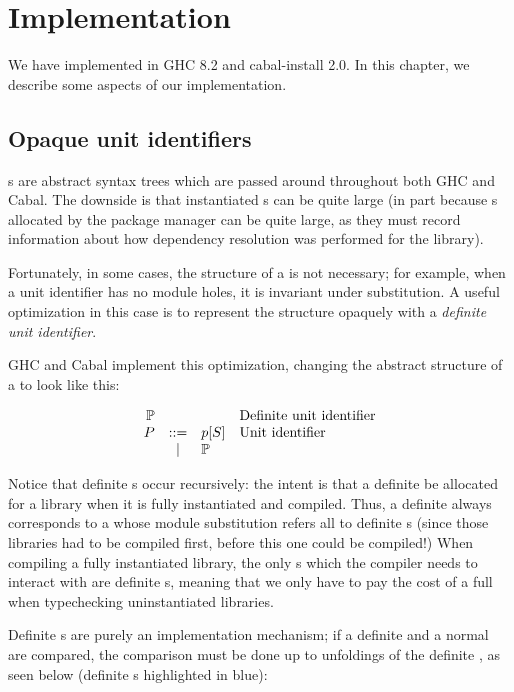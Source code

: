 \chapter{Implementation}
\label{sec:implementation}

We have implemented \Backpack{} in GHC 8.2 and cabal-install 2.0.  In
this chapter, we describe some aspects of our implementation.

\section{Opaque unit identifiers}
\label{sec:opaque-uid}

\Uid{}s are abstract syntax trees which are passed around throughout
both GHC and Cabal.  The downside is that instantiated \uid{}s
can be quite large (in part because \cid{}s allocated by the
package manager can be quite large, as they must record information
about how dependency resolution was performed for the library).

Fortunately, in some cases, the structure of a \uid{} is not necessary;
for example, when a unit identifier has no module holes, it is
invariant under substitution.  A useful optimization in this case
is to represent the structure opaquely with a \emph{definite unit
identifier}.

GHC and Cabal implement this optimization, changing the
abstract structure of a \uid{} to look like this:

\[
\begin{array}{rcll}
  \mathbb{P} &&& \text{Definite \uid{}} \\
  \UP &::=& \icid{\Up}{S} & \text{\Uid} \\
      & | & \mathbb{P} \\
\end{array}
\]

\noindent
Notice that definite \uid{}s occur recursively: the intent is that a
definite \uid{} be allocated for a library when it is fully instantiated
and compiled.  Thus, a definite \uid{} always corresponds to a \uid{}
whose module substitution refers all to definite \uid{}s (since those
libraries had to be compiled first, before this one could be compiled!)
When compiling a fully instantiated library, the only \uid{}s which the
compiler needs to interact with are definite \uid{}s, meaning that we
only have to pay the cost of a full \uid{} when typechecking uninstantiated
libraries.

Definite \uid{}s are purely an implementation mechanism; if a definite
\uid{} and a normal \uid{} are compared, the comparison must be done
up to unfoldings of the definite \uid{}, as seen below (definite \uid{}s
highlighted in blue):

